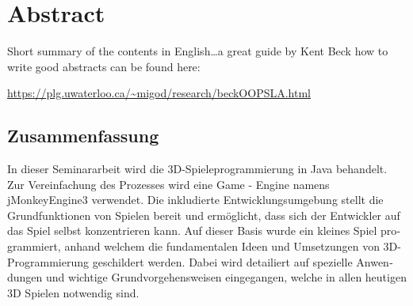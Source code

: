 \begingroup
\let\clearpage\relax
\let\cleardoublepage\relax
\let\cleardoublepage\relax


\ifx\myLanguage\english

\chapter*{Abstract}
Short summary of the contents in English\dots a great guide by 
Kent Beck how to write good abstracts can be found here:  
\begin{center}
\url{https://plg.uwaterloo.ca/~migod/research/beckOOPSLA.html}
\end{center}

\vfill

\fi

\begin{otherlanguage}{ngerman}
\chapter*{Zusammenfassung}
In dieser Seminararbeit wird die 3D-Spieleprogrammierung in Java behandelt. Zur Vereinfachung des Prozesses wird eine Game - Engine namens jMonkeyEngine3 verwendet. Die inkludierte Entwicklungsumgebung stellt die Grundfunktionen von Spielen bereit und ermöglicht, dass sich der Entwickler auf das Spiel selbst konzentrieren kann.
Auf dieser Basis wurde ein kleines Spiel programmiert, anhand welchem die fundamentalen Ideen und Umsetzungen von 3D-Programmierung geschildert werden. Dabei wird detailiert auf spezielle Anwendungen und wichtige Grundvorgehensweisen eingegangen, welche in allen heutigen 3D Spielen notwendig sind.

	
\end{otherlanguage}

\endgroup			

\vfill